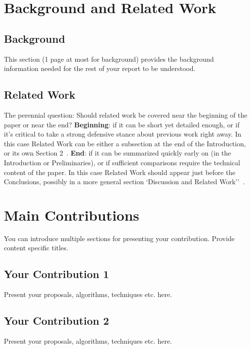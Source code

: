 \documentclass{winslabreport}
\begin{document}
\section{Background and Related Work}

\subsection{Background}

This section (1 page at most for background) provides the background information needed for the rest of your report to be understood. 

\subsection{Related Work}

The perennial question: Should related work be covered near the beginning of the paper or near the end?
\textbf{Beginning}: if it can be short yet detailed enough, or if it's critical to take a strong defensive stance about previous work right away. In this case Related Work can be either a subsection at the end of the Introduction, or its own Section 2~\cite{Widom2006}. \textbf{End}: if it can be summarized quickly early on (in the Introduction or Preliminaries), or if sufficient comparisons require the technical content of the paper. In this case Related Work should appear just before the Conclusions, possibly in a more general section `Discussion and Related Work''~\cite{Widom2006}.


\section{Main Contributions}

You can introduce multiple sections for presenting your contribution. Provide content specific titles. 

\subsection{Your Contribution 1}

Present your proposals, algorithms, techniques etc. here.

\subsection{Your Contribution 2}

Present your proposals, algorithms, techniques etc. here.
\end{document}
